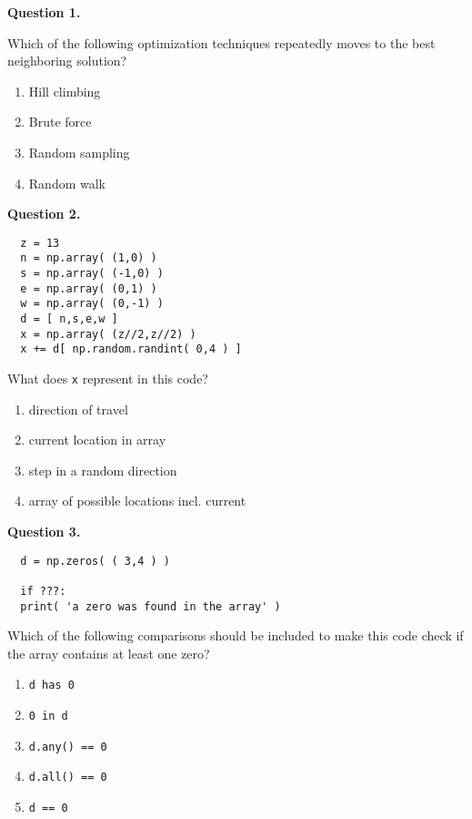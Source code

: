 \documentclass[12pt]{article}
\begin{document}
\bigskip

\bigskip


{\bf Question 1.}     

Which of the following optimization techniques repeatedly moves to the best neighboring solution?

\begin{enumerate}[label=\Alph*]
	\item  Hill climbing
	\item  Brute force
	\item  Random sampling
	\item  Random walk
\end{enumerate}



{\bf Question 2.} 
  \begin{Verbatim}
  z = 13
  n = np.array( (1,0) )
  s = np.array( (-1,0) )
  e = np.array( (0,1) )
  w = np.array( (0,-1) )
  d = [ n,s,e,w ]
  x = np.array( (z//2,z//2) )
  x += d[ np.random.randint( 0,4 ) ]
  \end{Verbatim}
  
  What does \texttt{x} represent in this code?
  
  \begin{enumerate}[label=\Alph*]
  	\item  direction of travel
  	\item  current location in array
  	\item  step in a random direction
  	\item  array of possible locations incl. current
  \end{enumerate}

{\bf Question 3.} 
  \begin{Verbatim}
  d = np.zeros( ( 3,4 ) )
  
  if ???:
  print( 'a zero was found in the array' )
  \end{Verbatim}
  
  Which of the following comparisons should be included to make this code check if the array contains at least one zero?
  
  \begin{enumerate}[label=\Alph*]
  	\item  \texttt{d has 0}
  	\item  \texttt{0 in d}
  	\item  \texttt{d.any() == 0}
  	\item  \texttt{d.all() == 0}
  	\item  \texttt{d == 0}
  \end{enumerate}
\end{document}
